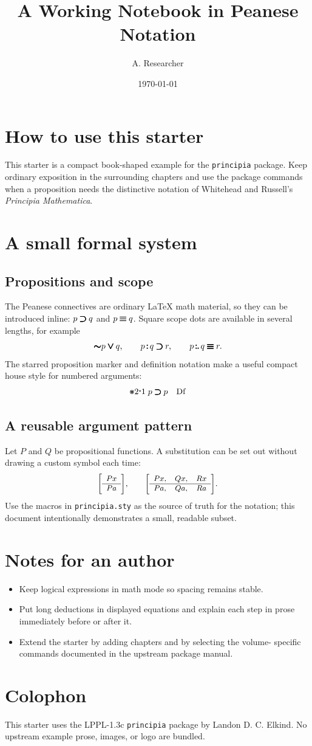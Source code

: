 \documentclass[11pt,oneside]{book}
\title{A Working Notebook in Peanese Notation}
\author{A. Researcher}
\date{\today}
\begin{document}
\frontmatter
\maketitle
\tableofcontents

\chapter{How to use this starter}
This starter is a compact book-shaped example for the \texttt{principia}
package. Keep ordinary exposition in the surrounding chapters and use the
package commands when a proposition needs the distinctive notation of
Whitehead and Russell's \emph{Principia Mathematica}.

\mainmatter
\chapter{A small formal system}
\section{Propositions and scope}
The Peanese connectives are ordinary LaTeX math material, so they can be
introduced inline: $p \pmimp q$ and $p \pmiff q$. Square scope dots are
available in several lengths, for example
\[
  \pmnot p \pmor q,\qquad
  p \pmandd q \pmimp r,\qquad
  p \pmanddd q \pmiff r.
\]
The starred proposition marker and definition notation make a useful compact
house style for numbered arguments:
\[
  \pmsn{2}{1}\; p \pmimp p \pmdf
\]
\section{A reusable argument pattern}
Let $P$ and $Q$ be propositional functions. A substitution can be set out
without drawing a custom symbol each time:
\[
  \pmsub{P x}{P a},\qquad
  \pmsubbb{P x}{P a}{Q x}{Q a}{R x}{R a}.
\]
Use the macros in \texttt{principia.sty} as the source of truth for the
notation; this document intentionally demonstrates a small, readable subset.

\chapter{Notes for an author}
\begin{itemize}
  \item Keep logical expressions in math mode so spacing remains stable.
  \item Put long deductions in displayed equations and explain each step in
        prose immediately before or after it.
  \item Extend the starter by adding chapters and by selecting the volume-
        specific commands documented in the upstream package manual.
\end{itemize}

\backmatter
\chapter*{Colophon}
This starter uses the LPPL-1.3c \texttt{principia} package by Landon D. C.
Elkind. No upstream example prose, images, or logo are bundled.
\end{document}
